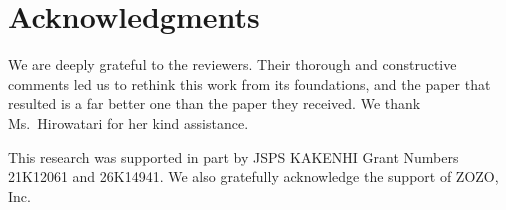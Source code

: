 \documentclass[11pt,a4paper]{article}
\begin{document}
\section{Acknowledgments}
We are deeply grateful to the reviewers. Their thorough and constructive
comments led us to rethink this work from its foundations, and the paper that
resulted is a far better one than the paper they received. We thank
Ms.\ Hirowatari for her kind assistance.

This research was supported in part by JSPS KAKENHI Grant Numbers 21K12061 and
26K14941. We also gratefully acknowledge the support of ZOZO, Inc.
\end{document}
